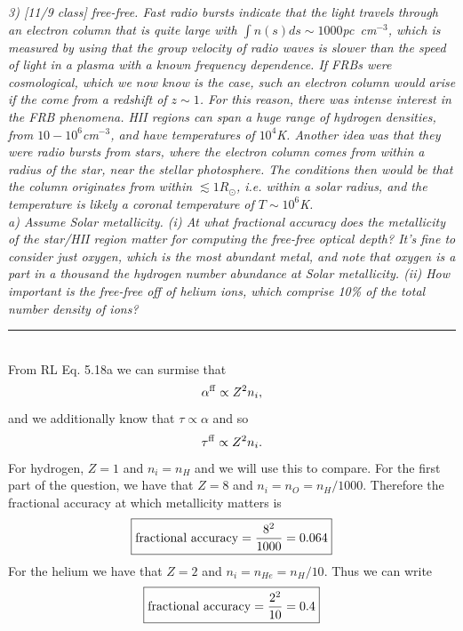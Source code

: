\documentclass[12pt, letterpaper, twoside]{article}
\newcommand{\answer}[1]{
    \par\noindent\rule{\textwidth}{0.4pt}\\#1\\
}
\begin{document}
{\it 3) {\it [11/9 class]} free-free. 
Fast radio bursts indicate that the light travels through an electron column that is quite large with $\int n(s) ds \sim 1000$pc~cm$^{-3}$, which is measured by using that the group velocity of radio waves is slower than the speed of light in a plasma with a known frequency dependence. If FRBs were cosmological, which we now know is the case, such an electron column would arise if the come from a redshift of $z\sim 1$.  For this reason, there was intense interest in the FRB phenomena. HII regions can span a huge range of hydrogen densities, from $10-10^6$cm$^{-3}$, and have temperatures of $10^4$K. Another idea was that they were radio bursts from stars, where the electron column comes from within a radius of the star, near the stellar photosphere. The conditions then would be that the column originates from within $\lesssim 1 R_\odot$, i.e. within a solar radius, and the temperature is likely a coronal temperature of $T\sim 10^6$K.\\

a) Assume Solar metallicity. (i) At what fractional accuracy does the metallicity of the star/HII region matter for computing the free-free optical depth?   It's fine to consider just oxygen, which is the most abundant metal, and note that oxygen is a part in a thousand the hydrogen number abundance at Solar metallicity. (ii) How important is the free-free off of helium ions, which comprise 10\% of the total number density of ions?}

\answer{
    From RL Eq. 5.18a we can surmise that
    \begin{equation}
        \alpha^{\rm ff} \propto Z^2 n_i,
    \end{equation}
    and we additionally know that $\tau \propto \alpha$ and so
    \begin{equation}
        \tau^{\rm ff} \propto Z^2 n_i.
    \end{equation}
    For hydrogen, $Z = 1$ and $n_i = n_H$ and we will use this to compare. For the first part of the question, we have that $Z = 8$ and $n_i = n_O = n_H / 1000$. Therefore the fractional accuracy at which metallicity matters is
    \begin{equation}
        \boxed{ {\rm fractional\ accuracy} = \frac{8^2}{1000} = 0.064 }
    \end{equation}
    For the helium we have that $Z = 2$ and $n_i = n_{He} = n_H / 10$. Thus we can write
    \begin{equation}
        \boxed{ {\rm fractional\ accuracy} = \frac{2^2}{10} = 0.4 }
    \end{equation}
}
\end{document}

